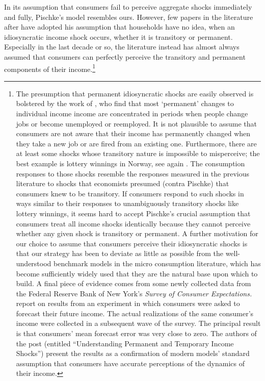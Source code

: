 \documentclass[titlepage]{\econtex}\newcommand{\texname}{cAndCwithStickyE}
\begin{document}
In its assumption that consumers fail to perceive aggregate shocks immediately and fully, Pischke's model resembles ours.  However, few papers in the literature after \cite{pischkeMicroMacro} have adopted his assumption that households have no idea, when an idiosyncratic income shock occurs, whether it is transitory or permanent.  Especially in the last decade or so, the literature instead has almost always assumed that consumers can perfectly perceive the transitory and permanent components of their income.\footnote{The presumption that permanent idiosyncratic shocks are easily observed is bolstered by the work of \cite{lmp:wagerisk}, who find that most `permanent' changes to individual income income are concentrated in periods when people change jobs or become unemployed or reemployed.  It is not plausible to assume that consumers are not aware that their income has permanently changed when they take a new job or are fired from an existing one.  Furthermore, there are at least some shocks whose transitory nature is impossible to misperceive; the best example is lottery winnings in Norway, see again \cite{fhnMPC}.  The consumption responses to those shocks resemble the responses measured in the previous literature to shocks that economists presumed (contra Pischke) that consumers knew to be transitory.  If consumers respond to such shocks in ways similar to their responses to unambiguously transitory shocks like lottery winnings, it seems hard to accept Pischke's crucial assumption that consumers treat all income shocks identically because they cannot perceive whether any given shock is transitory or permanent. A further motivation for our choice to assume that consumers perceive their idiosyncratic shocks is that our strategy has been to deviate as little as possible from the well-understood benchmark models in the micro consumption literature, which has become sufficiently widely used that they are the natural base upon which to build.  A final piece of evidence comes from some newly collected data from the Federal Reserve Bank of New York's {\it Survey of Consumer Expectations.}  \cite{kmpIncomeExpectations} report on results from an experiment in which consumers were asked to forecast their future income.  The actual realizations of the same consumer's income were collected in a subsequent wave of the survey.  The principal result is that consumers' mean forecast error was very close to zero.  The authors of the post (entitled ``Understanding Permanent and Temporary Income Shocks'') present the results as a confirmation of modern models' standard assumption that consumers have accurate perceptions of the dynamics of their income.}
\end{document}
